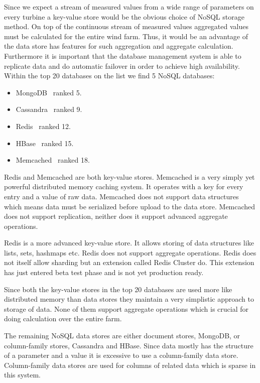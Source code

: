 Since we expect a stream of measured values from a wide range of parameters on every turbine a key-value store would be the obvious choice of NoSQL storage method. On top of the continuous stream of measured values aggregated values must be calculated for the entire wind farm. Thus, it would be an advantage of the data store has features for such aggregation and aggregate calculation. Furthermore it is important that the database management system is able to replicate data and do automatic failover in order to achieve high availability.
Within the top 20 databases on the list we find 5 NoSQL databases:

\begin{itemize}
\item MongoDB~\cite{mongodb} ranked 5.
\item Cassandra~\cite{cassandra} ranked 9.
\item Redis~\cite{redis} ranked 12.
\item HBase~\cite{hbase} ranked 15.
\item Memcached~\cite{memcached} ranked 18.
\end{itemize}

Redis and Memcached are both key-value stores. Memcached is a very simply yet powerful distributed memory caching system.
It operates with a key for every entry and a value of raw data.
Memcached does not support data structures which means data must be serialized before upload to the data store.
Memcached does not support replication, neither does it support advanced aggregate operations.

Redis is a more advanced key-value store.
It allows storing of data structures like lists, sets, hashmaps etc.
Redis does not support aggregate operations.
Redis does not itself allow sharding but an extension called Redis Cluster do. This extension has just entered beta test phase and is not yet production ready.

Since both the key-value stores in the top 20 databases are used more like distributed memory than data stores they maintain a very simplistic approach to storage of data.
None of them support aggregate operations which is crucial for doing calculation over the entire farm.

The remaining NoSQL data stores are either document stores, MongoDB, or column-family stores, Cassandra and HBase.
Since data mostly has the structure of a parameter and a value it is excessive to use a column-family data store. 
Column-family data stores are used for columns of related data which is sparse in this system.

